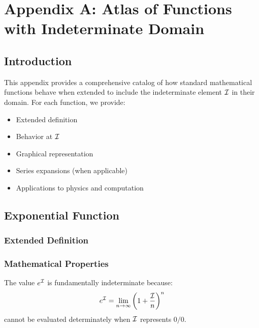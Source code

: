 \chapter*{Appendix A: Atlas of Functions with Indeterminate Domain}
\label{app:function-atlas}

\section*{Introduction}

This appendix provides a comprehensive catalog of how standard mathematical functions behave when extended to include the indeterminate element $\I$ in their domain. For each function, we provide:
\begin{itemize}
    \item Extended definition
    \item Behavior at $\I$
    \item Graphical representation
    \item Series expansions (when applicable)
    \item Applications to physics and computation
\end{itemize}

\section*{Exponential Function}

\subsection*{Extended Definition}


\subsection*{Mathematical Properties}

\begin{proposition}[Exponential at $\I$]
The value $e^{\mathcal{I}}$ is fundamentally indeterminate because:
\[
e^{\mathcal{I}} = \lim_{n \to \infty} \left(1 + \frac{\mathcal{I}}{n}\right)^n
\]
cannot be evaluated determinately when $\I$ represents $0/0$.
\end{proposition}

